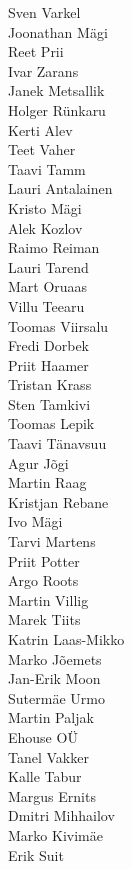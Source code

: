 \begin{multicols}{2}
Sven Varkel\\
Joonathan Mägi\\
Reet Prii\\
Ivar Zarans\\
Janek Metsallik\\
Holger Rünkaru\\
Kerti Alev\\
Teet Vaher\\
Taavi Tamm\\
Lauri Antalainen\\
Kristo Mägi\\
Alek Kozlov\\
Raimo Reiman\\
Lauri Tarend\\
Mart Oruaas \\
Villu Teearu\\
Toomas Viirsalu\\
Fredi Dorbek\\
Priit Haamer\\
Tristan Krass\\
Sten Tamkivi\\
Toomas Lepik\\
Taavi Tänavsuu\\
Agur Jõgi\\
Martin Raag\\
Kristjan Rebane \\
Ivo Mägi\\
Tarvi Martens\\
Priit Potter\\
Argo Roots\\
Martin Villig\\
Marek Tiits\\
Katrin Laas-Mikko\\
Marko Jõemets \\
Jan-Erik Moon\\
Sutermäe Urmo\\
Martin Paljak\\
Ehouse OÜ\\
Tanel Vakker\\
Kalle Tabur\\
Margus Ernits\\
Dmitri Mihhailov\\
Marko Kivimäe\\
Erik Suit\\
\end{multicols}